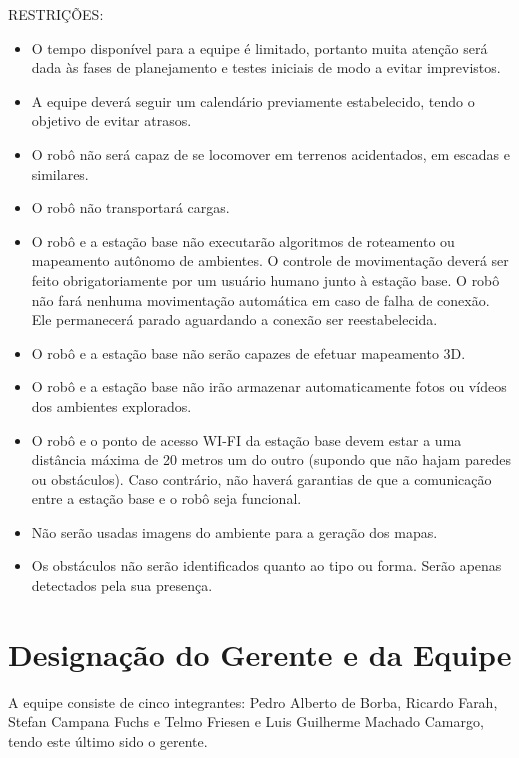 RESTRIÇÕES:
\begin{itemize}
  \item O tempo disponível para a equipe é limitado, portanto muita atenção será dada às fases de planejamento e testes iniciais de modo a evitar imprevistos.
  \item A equipe deverá seguir um calendário previamente estabelecido, tendo o objetivo de evitar atrasos.
  \item O robô não será capaz de se locomover em terrenos acidentados, em escadas e similares.
  \item O robô não transportará cargas.
  \item O robô e a estação base não executarão algoritmos de roteamento ou mapeamento autônomo de ambientes. O controle de movimentação deverá ser feito obrigatoriamente por um usuário humano junto à estação base. O robô não fará nenhuma movimentação automática em caso de falha de conexão. Ele permanecerá parado aguardando a conexão ser reestabelecida.
  \item O robô e a estação base não serão capazes de efetuar mapeamento 3D.
  \item O robô e a estação base não irão armazenar automaticamente fotos ou vídeos dos ambientes explorados.
  \item O robô e o ponto de acesso WI-FI da estação base devem estar a uma distância máxima de 20 metros um do outro (supondo que não hajam paredes ou obstáculos). Caso contrário, não haverá garantias de que a comunicação entre a estação base e o robô seja funcional.
  \item Não serão usadas imagens do ambiente para a geração dos mapas.
  \item Os obstáculos não serão identificados quanto ao tipo ou forma. Serão apenas detectados pela sua presença.
\end{itemize}

\chapter{Designação do Gerente e da Equipe}
A equipe consiste de cinco integrantes: Pedro Alberto de Borba, Ricardo Farah, Stefan Campana Fuchs e Telmo Friesen e Luis Guilherme Machado Camargo, tendo este último sido o gerente.
